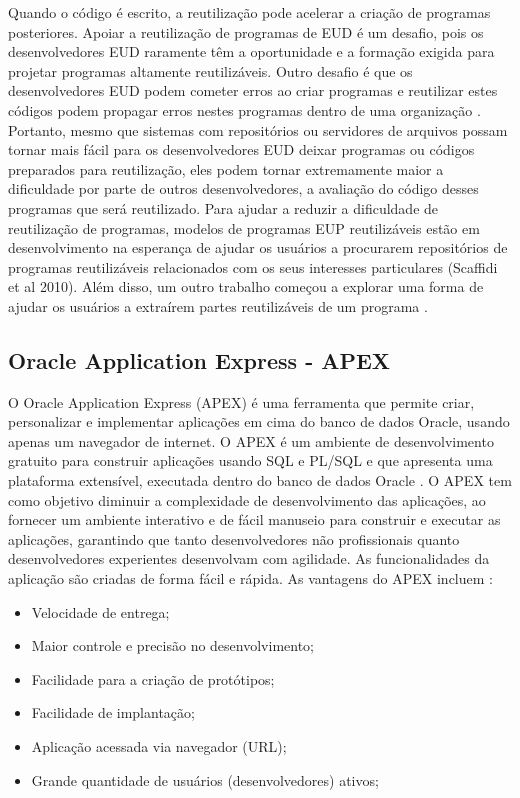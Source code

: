 Quando o código é escrito, a reutilização pode acelerar a criação de programas posteriores. Apoiar a reutilização de programas de EUD é um desafio, pois os desenvolvedores EUD raramente têm a oportunidade e a formação exigida para projetar programas altamente reutilizáveis. Outro desafio é que os desenvolvedores EUD podem cometer erros ao criar programas e reutilizar estes códigos podem propagar erros nestes programas dentro de uma organização \cite{mackay1990patterns}. Portanto, mesmo que sistemas com repositórios ou servidores de arquivos possam tornar mais fácil para os desenvolvedores EUD deixar programas ou códigos preparados para reutilização, eles podem tornar extremamente maior a dificuldade por parte de outros desenvolvedores, a avaliação do código desses programas que será reutilizado. Para ajudar a reduzir a dificuldade de reutilização de programas, modelos de programas EUP reutilizáveis estão em desenvolvimento na esperança de ajudar os usuários a procurarem repositórios de programas reutilizáveis relacionados com os seus interesses particulares \cite{scaffidi2010using} (Scaffidi et al 2010). Além disso, um outro trabalho começou a explorar uma forma de ajudar os usuários a extraírem partes reutilizáveis de um programa \cite{oney2009firecrystal}.

\subsection{Oracle Application Express - APEX}

O Oracle Application Express (APEX) é uma ferramenta que permite criar, personalizar e implementar aplicações em cima do banco de dados Oracle, usando apenas um navegador de internet. O APEX é um ambiente de desenvolvimento gratuito para construir aplicações usando SQL e PL/SQL e que apresenta uma plataforma extensível, executada dentro do banco de dados Oracle \cite{oracleApex}. O APEX tem como objetivo diminuir a complexidade de desenvolvimento das aplicações, ao fornecer um ambiente interativo e de fácil manuseio para construir e executar as aplicações, garantindo que tanto desenvolvedores não profissionais quanto desenvolvedores experientes desenvolvam com agilidade. As funcionalidades da aplicação são criadas de forma fácil e rápida. As vantagens do APEX incluem \cite{oracleApex}:
\begin{itemize}
	\item Velocidade de entrega;
	\item Maior controle e precisão no desenvolvimento;
	\item Facilidade para a criação de protótipos;
	\item Facilidade de implantação;
	\item Aplicação acessada via navegador (URL);
	\item Grande quantidade de usuários (desenvolvedores) ativos;
\end{itemize}

